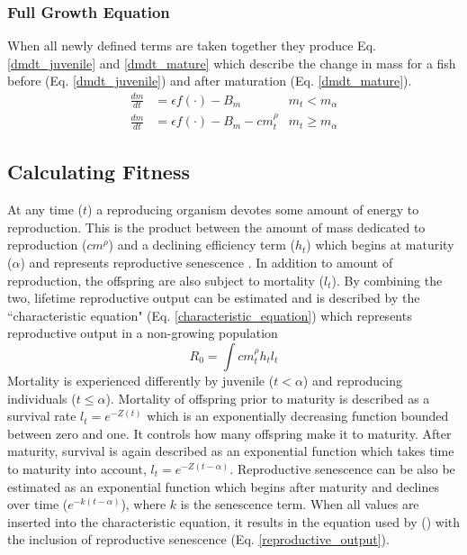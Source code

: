 \documentclass[a4paper, 11pt, hidelinks]{article} %
\begin{document}
	\subsubsection{Full Growth Equation}
	When all newly defined terms are taken together they produce Eq. \ref{dmdt_juvenile}  and \ref{dmdt_mature} which describe the change in mass for a fish before (Eq. \ref{dmdt_juvenile}) and after maturation (Eq. \ref{dmdt_mature}).
	\begin{align}
		\label{dmdt_juvenile}
		\frac{dm}{dt} &= \epsilon f(\cdot) - B_m & m_t < m_\alpha \\
		\label{dmdt_mature}
		\frac{dm}{dt} &= \epsilon f(\cdot) - B_m - cm_t^\rho & m_t \geq m_\alpha
	\end{align}

	
	
	\subsection{Calculating Fitness}
	At any time ($ t $) a reproducing organism devotes some amount of energy to reproduction.  This is the product between the amount of mass dedicated to reproduction ($ cm^\rho $) and a declining efficiency term ($ h_t $) which begins at maturity ($ \alpha $) and represents reproductive senescence \parencite{Benoit2018, Vrtilek2018, Stearns2000}.  In addition to amount of reproduction, the offspring are also subject to mortality ($ l_t $).  By combining the two, lifetime reproductive output can be estimated and is described by the ``characteristic equation" (Eq. \ref{characteristic_equation}) which represents reproductive output in a non-growing population \parencite{Tsoukali2016, roff1993, Roff2001, stearns1992evolution, Arendt2011, Roff1986, Roff1984}
	\begin{equation}
		\label{characteristic_equation}
		R_0 = \int c m_t^\rho h_t l_t 
	\end{equation}
	Mortality is experienced differently by juvenile ($ t < \alpha $) and reproducing individuals ($ t \leq \alpha $). %
	Mortality of offspring prior to maturity is described as a survival rate $ l_t = e^{-Z(t)} $ which is an exponentially decreasing function bounded between zero and one.  It controls how many offspring make it to maturity.  After maturity, survival is again described as an exponential function which takes time to maturity into account, $ l_t = e^{-Z(t-\alpha)} $.  
	Reproductive senescence can be also be estimated as an exponential function which begins after maturity and declines over time  ($ e^{-k(t-\alpha)} $), where $ k $ is the senescence term.  When all values are inserted into the characteristic equation, it results in the equation used by \citeauthor{Charnov2001} (\citeyear{Charnov2001}) with the inclusion of reproductive senescence (Eq. \ref{reproductive_output}).
\end{document}
